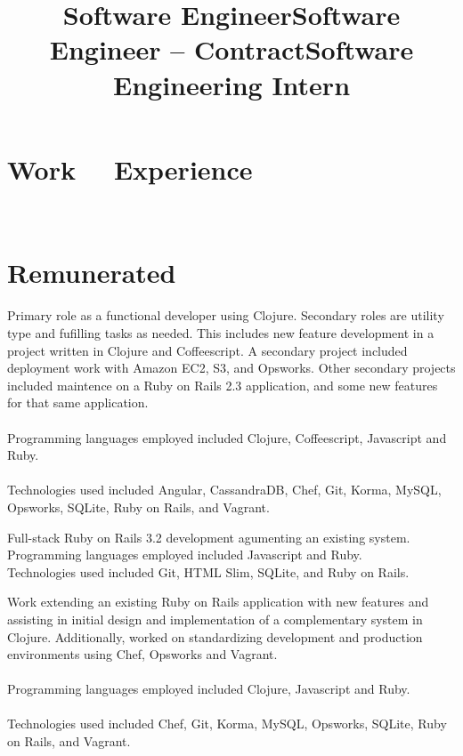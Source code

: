 \documentclass[margintitle,line]{res}
\renewcommand{\subsection}[1]{\section{\normalfont #1}}
\begin{document}
\begin{resume}

\section{Work \ \ Experience}
\ \\
\subsection{Remunerated}

\title{Software Engineer}
\begin{position}
 Primary role as a functional developer using Clojure. Secondary roles are utility type and fufilling tasks as needed. This includes new feature development in a project written in Clojure and Coffeescript. A secondary project included deployment work with Amazon EC2, S3, and Opsworks. Other secondary projects included maintence on a Ruby on Rails 2.3 application, and some new features for that same application. \\ \ \\
 Programming languages employed included Clojure, Coffeescript, Javascript and Ruby. \\ \ \\
 Technologies used included Angular, CassandraDB, Chef, Git, Korma, MySQL, Opsworks, SQLite, Ruby on Rails, and Vagrant.
\end{position}

\title{Software Engineer -- Contract}
\begin{position}
 Full-stack Ruby on Rails 3.2 development agumenting an existing system. \\
 Programming languages employed included Javascript and Ruby. \\
 Technologies used included Git, HTML Slim, SQLite, and Ruby on Rails.
\end{position}

\title{Software Engineering Intern}
\begin{position}
 Work extending an existing Ruby on Rails application with new features and assisting in initial design and implementation of a complementary system in  Clojure. Additionally, worked on standardizing development and production environments using Chef, Opsworks and Vagrant. \\ \ \\
 Programming languages employed included Clojure, Javascript and Ruby. \\ \ \\
 Technologies used included Chef, Git, Korma, MySQL, Opsworks, SQLite, Ruby on Rails, and Vagrant.
\end{position}


\end{resume}
\end{document}
